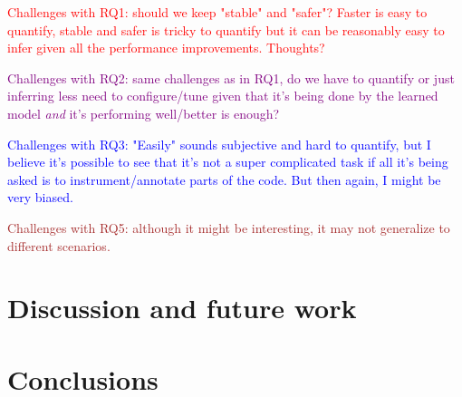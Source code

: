 \textcolor{red}{Challenges with RQ1: should we keep "stable" and "safer"? Faster is easy to quantify, stable and safer is tricky to quantify but it can be reasonably easy to infer given all the performance improvements. Thoughts?}

\textcolor{purple}{Challenges with RQ2: same challenges as in RQ1, do we have to quantify or just inferring less need to configure/tune given that it's being done by the learned model \textit{and} it's performing well/better is enough?}

\textcolor{blue}{Challenges with RQ3: "Easily" sounds subjective and hard to quantify, but I believe it's possible to see that it's not a super complicated task if all it's being asked is to instrument/annotate parts of the code. But then again, I might be very biased.}

\textcolor{brown}{Challenges with RQ5: although it might be interesting, it may not generalize to different scenarios.}

\section{Discussion and future work}

\section{Conclusions}


\nocite{*}

\begin{acks}

\end{acks} 